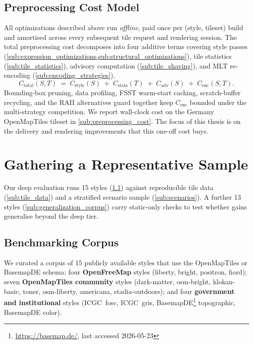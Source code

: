 {\subsection{Preprocessing Cost Model}\label{sub:preprocessing_cost_model}

All optimizations described above run \emph{offline}, paid once per (style, tileset) build and amortised across every subsequent tile request and rendering session.
The total preprocessing cost decomposes into four additive terms covering style passes (\cref{sub:expression_optimizations,sub:structural_optimizations}), tile statistics (\cref{sub:tile_statistics}), advisory computation (\cref{sub:tile_shaving}), and \ac{MLT} re-encoding (\cref{sub:encoding_strategies}).
\begin{equation}\label{eq:cost_model}
    C_\text{total}(S, T) \;=\; C_\text{style}(S) \;+\; C_\text{stats}(T) \;+\; C_\text{adv}(S) \;+\; C_\text{enc}(S, T).
\end{equation}
Bounding-box pruning, data profiling, \ac{FSST} warm-start caching, scratch-buffer recycling, and the \ac{RAII} alternatives guard together keep $C_\text{enc}$ bounded under the multi-strategy competition.
We report wall-clock cost on the Germany OpenMapTiles tileset in \cref{sub:preprocessing_cost}.
The focus of this thesis is on the delivery and rendering improvements that this one-off cost buys.

\section{Gathering a Representative Sample}\label{sec:gathering_sample}

Our deep evaluation runs 15 styles (\cref{sub:deep_corpus}) against reproducible tile data (\cref{sub:tile_data}) and a stratified scenario sample (\cref{sub:scenarios}).
A further 13 styles (\cref{sub:generalization_corpus}) carry static-only checks to test whether gains generalise beyond the deep tier.

\subsection{Benchmarking Corpus}\label{sub:deep_corpus}

We curated a corpus of 15 publicly available styles that use the OpenMapTiles or BasemapDE schema:
four \textbf{OpenFreeMap} styles (liberty, bright, positron, fiord);
seven \textbf{OpenMapTiles community} styles (dark-matter, osm-bright, klokan-basic, toner, osm-liberty, americana, stadia-outdoors);
and four \textbf{government and institutional} styles (ICGC~fosc, ICGC~gris, Basemap\-DE\footnote{\url{https://basemap.de/}, last accessed 2026-05-23} topo\-graphic, Basemap\-DE color).

}
